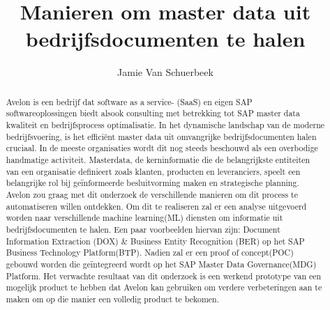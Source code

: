 \documentclass{hogent-article}
\title{Manieren om master data uit bedrijfsdocumenten te halen}
\author{Jamie Van Schuerbeek}
\begin{document}
\begin{abstract}

Avelon is een bedrijf dat software as a service- (SaaS) en eigen SAP softwareoplossingen biedt alsook consulting met betrekking tot SAP master data kwaliteit en bedrijfsprocess optimalisatie. In het dynamische landschap van de moderne bedrijfsvoering, is het efficiënt master data uit omvangrijke bedrijfsdocumenten halen cruciaal. In de meeste organisaties wordt dit nog steeds beschouwd als een overbodige handmatige activiteit. Masterdata, de kerninformatie die de belangrijkste entiteiten van een organisatie definieert zoals klanten, producten en leveranciers, speelt een belangrijke rol bij geïnformeerde besluitvorming maken en strategische planning. Avelon zou graag met dit onderzoek de verschillende manieren om dit process te automatiseren willen ontdekken. Om dit te realiseren zal er een analyse uitgevoerd worden naar verschillende machine learning(ML) diensten om informatie uit bedrijfsdocumenten te halen. Een paar voorbeelden hiervan zijn: Document Information Extraction (DOX) \& Business Entity Recognition (BER) op het SAP Business Technology Platform(BTP). Nadien zal er een proof of concept(POC) gebouwd worden die geïntegreerd wordt op het SAP Master Data Governance(MDG) Platform. Het verwachte resultaat van dit onderzoek is een werkend prototype van een mogelijk product te hebben dat Avelon kan gebruiken om verdere verbeteringen aan te maken om op die manier een volledig product te bekomen.
\end{abstract}

\tableofcontents



\printbibliography[heading=bibintoc]
\end{document}
